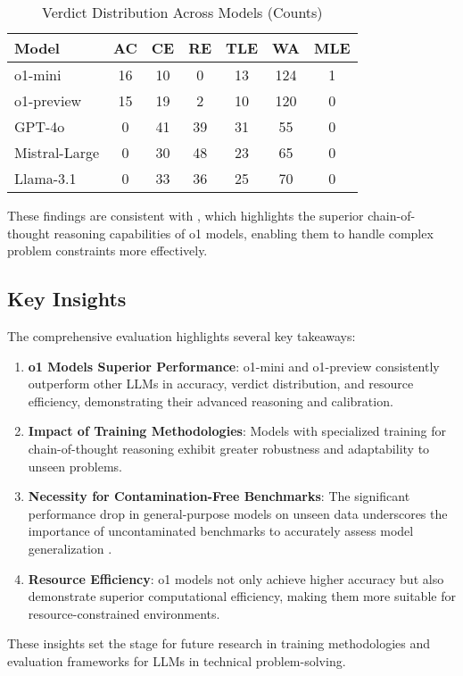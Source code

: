 \begin{table}[htbp]
    \caption{Verdict Distribution Across Models (Counts)}
    \centering
    \begin{tabular}{@{}lcccccc@{}}
        \toprule
        \textbf{Model} & \textbf{AC} & \textbf{CE} & \textbf{RE} & \textbf{TLE} & \textbf{WA} & \textbf{MLE} \\
        \midrule
        o1-mini        & 16          & 10          & 0           & 13           & 124         & 1           \\
        o1-preview     & 15          & 19          & 2           & 10           & 120         & 0           \\
        GPT-4o         & 0           & 41          & 39          & 31           & 55          & 0           \\
        Mistral-Large  & 0           & 30          & 48          & 23           & 65          & 0           \\
        Llama-3.1      & 0           & 33          & 36          & 25           & 70          & 0           \\
        \bottomrule
    \end{tabular}
    \label{tab:verdict_distribution_counts}
\end{table}

These findings are consistent with \cite{b4}, which highlights the superior chain-of-thought reasoning capabilities of o1 models, enabling them to handle complex problem constraints more effectively.

\subsection{Key Insights}
The comprehensive evaluation highlights several key takeaways:
\begin{enumerate}
    \item \textbf{o1 Models Superior Performance}: o1-mini and o1-preview consistently outperform other LLMs in accuracy, verdict distribution, and resource efficiency, demonstrating their advanced reasoning and calibration.
    \item \textbf{Impact of Training Methodologies}: Models with specialized training for chain-of-thought reasoning exhibit greater robustness and adaptability to unseen problems.
    \item \textbf{Necessity for Contamination-Free Benchmarks}: The significant performance drop in general-purpose models on unseen data underscores the importance of uncontaminated benchmarks to accurately assess model generalization \cite{b2,b13}.
    \item \textbf{Resource Efficiency}: o1 models not only achieve higher accuracy but also demonstrate superior computational efficiency, making them more suitable for resource-constrained environments.
\end{enumerate}

These insights set the stage for future research in training methodologies and evaluation frameworks for LLMs in technical problem-solving.

